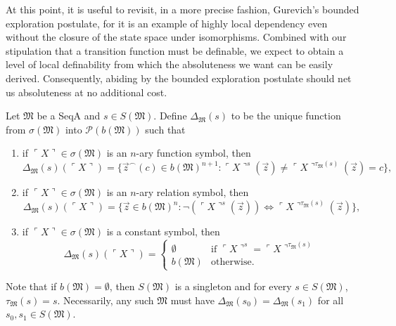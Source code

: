 \documentclass[12pt]{article}
\numberwithin{equation}{section}
\begin{document}
At this point, it is useful to revisit, in a more precise fashion, Gurevich's bounded exploration postulate, for it is an example of highly local dependency even without the closure of the state space under isomorphisms. Combined with our stipulation that a transition function must be definable, we expect to obtain a level of local definability from which the absoluteness we want can be easily derived. Consequently, abiding by the bounded exploration postulate should net us absoluteness at no additional cost.

\begin{defi}
Let $\mathfrak{M}$ be a SeqA and $s \in S(\mathfrak{M})$. Define $\Delta_{\mathfrak{M}}(s)$ to be the unique function from $\sigma(\mathfrak{M})$ into $\mathcal{P}(b(\mathfrak{M}))$ such that
\begin{enumerate}[label=(\alph*)]
    \item if $\ulcorner X \urcorner \in \sigma(\mathfrak{M})$ is an $n$-ary function symbol, then 
    \begin{equation*}
        \Delta_{\mathfrak{M}}(s)(\ulcorner X \urcorner) = \{\Vec{z}^{\frown}(c) \in b(\mathfrak{M})^{n + 1} : \ulcorner X \urcorner^{s}(\Vec{z}) \neq \ulcorner X \urcorner^{\tau_{\mathfrak{M}}(s)}(\Vec{z}) = c \} \text{,}
    \end{equation*}
    \item if $\ulcorner X \urcorner \in \sigma(\mathfrak{M})$ is an $n$-ary relation symbol, then 
    \begin{equation*}
        \Delta_{\mathfrak{M}}(s)(\ulcorner X \urcorner) = \{\Vec{z} \in b(\mathfrak{M})^n : \neg (\ulcorner X \urcorner^{s}(\Vec{z})) \iff \ulcorner X \urcorner^{\tau_{\mathfrak{M}}(s)}(\Vec{z})\} \text{,}
    \end{equation*}
    \item if $\ulcorner X \urcorner \in \sigma(\mathfrak{M})$ is a constant symbol, then 
    \begin{equation*}
        \Delta_{\mathfrak{M}}(s)(\ulcorner X \urcorner) =
        \begin{cases}
            \emptyset & \text{if } \ulcorner X \urcorner^{s} = \ulcorner X \urcorner^{\tau_{\mathfrak{M}}(s)} \\
            b(\mathfrak{M}) & \text{otherwise.}
        \end{cases}
    \end{equation*}
\end{enumerate}
Note that if $b(\mathfrak{M}) = \emptyset$, then $S(\mathfrak{M})$ is a singleton and for every $s \in S(\mathfrak{M})$, $\tau_{\mathfrak{M}}(s) = s$. Necessarily, any such $\mathfrak{M}$ must have $\Delta_{\mathfrak{M}}(s_0) = \Delta_{\mathfrak{M}}(s_1)$ for all $s_0, s_1 \in S(\mathfrak{M})$.
\end{defi}
\end{document}
